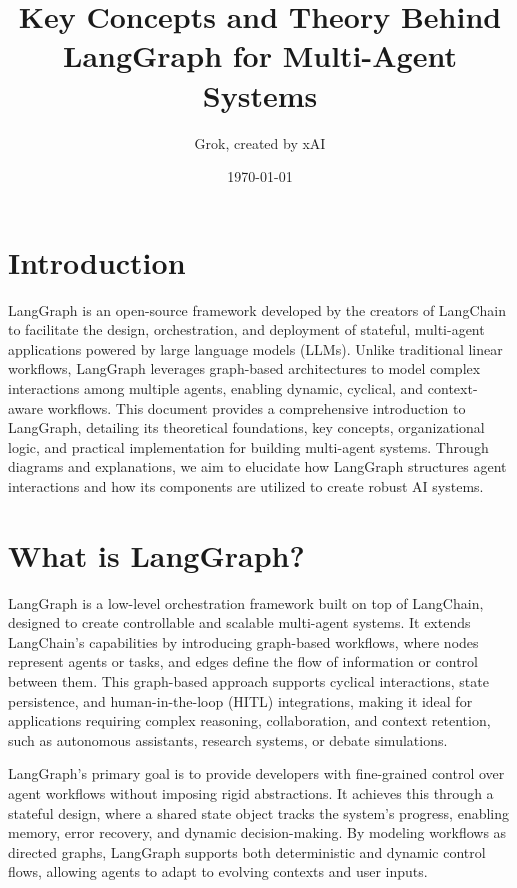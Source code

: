 \documentclass{article}
\title{Key Concepts and Theory Behind LangGraph for Multi-Agent Systems}
\author{Grok, created by xAI}
\date{\today}
\begin{document}
\maketitle

\section{Introduction}

LangGraph is an open-source framework developed by the creators of LangChain to facilitate the design, orchestration, and deployment of stateful, multi-agent applications powered by large language models (LLMs). Unlike traditional linear workflows, LangGraph leverages graph-based architectures to model complex interactions among multiple agents, enabling dynamic, cyclical, and context-aware workflows. This document provides a comprehensive introduction to LangGraph, detailing its theoretical foundations, key concepts, organizational logic, and practical implementation for building multi-agent systems. Through diagrams and explanations, we aim to elucidate how LangGraph structures agent interactions and how its components are utilized to create robust AI systems.

\section{What is LangGraph?}

LangGraph is a low-level orchestration framework built on top of LangChain, designed to create controllable and scalable multi-agent systems. It extends LangChain’s capabilities by introducing graph-based workflows, where nodes represent agents or tasks, and edges define the flow of information or control between them. This graph-based approach supports cyclical interactions, state persistence, and human-in-the-loop (HITL) integrations, making it ideal for applications requiring complex reasoning, collaboration, and context retention, such as autonomous assistants, research systems, or debate simulations.

LangGraph’s primary goal is to provide developers with fine-grained control over agent workflows without imposing rigid abstractions. It achieves this through a stateful design, where a shared state object tracks the system’s progress, enabling memory, error recovery, and dynamic decision-making. By modeling workflows as directed graphs, LangGraph supports both deterministic and dynamic control flows, allowing agents to adapt to evolving contexts and user inputs.
\end{document}
